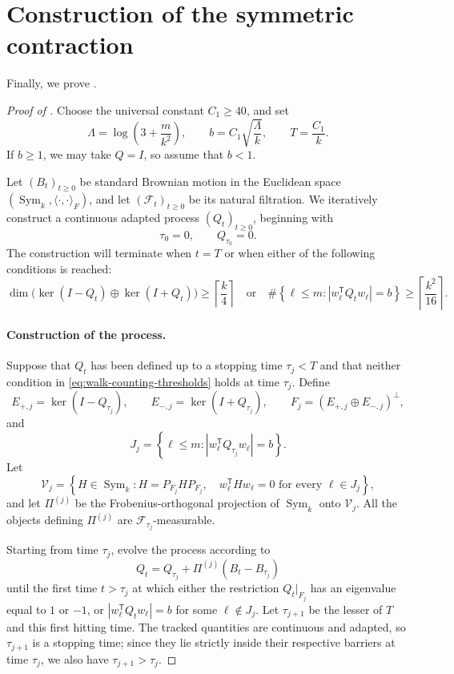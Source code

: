 \documentclass[11pt,reqno,letterpaper]{amsart}
\newcommand{\Sym}{\operatorname{Sym}}
\newcommand{\abs}[1]{\left\lvert #1\right\rvert}
\begin{document}
\section{Construction of the symmetric contraction}
\label{sec:spectral-proof}

Finally, we prove .

\begin{proof}[Proof of ]
Choose the universal constant $C_1\geq 40$, and set
\[
 \Lambda=\log\left(3+\frac{m}{k^2}\right),
 \qquad
 b=C_1\sqrt{\frac{\Lambda}{k}},
 \qquad
 T=\frac{C_1}{k}.
\]
If $b\geq1$, we may take $Q=I$, so assume that $b<1$.

Let $(B_t)_{t\geq0}$ be standard Brownian motion in the Euclidean space
$(\Sym_k,\langle\cdot,\cdot\rangle_F)$, and let
$(\mathcal F_t)_{t\geq0}$ be its natural filtration. We iteratively
construct a continuous adapted process $(Q_t)_{t\geq0}$, beginning with
\[
 \tau_0=0,
 \qquad
 Q_{\tau_0}=0.
\]
The construction will terminate when $t=T$ or when either of the
following conditions is reached:
\begin{equation}
\label{eq:walk-counting-thresholds}
 \dim\bigl(\ker(I-Q_t)\oplus\ker(I+Q_t)\bigr)
 \geq\left\lceil\frac{k}{4}\right\rceil
 \quad\text{or}\quad
 \#\left\{
 \ell\leq m:
 \abs{w_\ell^{\mathsf T}Q_tw_\ell}=b
 \right\}
 \geq\left\lceil\frac{k^2}{16}\right\rceil .
\end{equation}

\paragraph{\bf Construction of the process.}
Suppose that $Q_t$ has been defined up to a stopping time
$\tau_j<T$ and that neither condition in
\eqref{eq:walk-counting-thresholds} holds at time $\tau_j$. Define
\[
 E_{+,j}=\ker(I-Q_{\tau_j}),
 \qquad
 E_{-,j}=\ker(I+Q_{\tau_j}),
 \qquad
 F_j=(E_{+,j}\oplus E_{-,j})^\perp,
\]
and
\[
 J_j=
 \left\{
 \ell\leq m:
 \abs{w_\ell^{\mathsf T}Q_{\tau_j}w_\ell}=b
 \right\}.
\]
Let
\[
 \mathcal V_j=
 \left\{
 H\in\Sym_k:
 H=P_{F_j}HP_{F_j},
 \quad
 w_\ell^{\mathsf T}Hw_\ell=0
 \text{ for every }\ell\in J_j
 \right\},
\]
and let $\Pi^{(j)}$ be the Frobenius-orthogonal projection of $\Sym_k$
onto $\mathcal V_j$. All the objects defining $\Pi^{(j)}$ are
$\mathcal F_{\tau_j}$-measurable.

Starting from time $\tau_j$, evolve the process according to
\[
 Q_t
 =
 Q_{\tau_j}+\Pi^{(j)}(B_t-B_{\tau_j})
\]
until the first time $t>\tau_j$ at which either the restriction
$Q_t|_{F_j}$ has an eigenvalue equal to $1$ or $-1$, or
$
 \abs{w_\ell^{\mathsf T}Q_tw_\ell}=b
$
for some $\ell\notin J_j$. Let $\tau_{j+1}$ be the lesser of $T$ and
this first hitting time. The tracked quantities are continuous and
adapted, so $\tau_{j+1}$ is a stopping time; since they lie strictly
inside their respective barriers at time $\tau_j$, we also have
$\tau_{j+1}>\tau_j$.


\end{proof}
\end{document}
